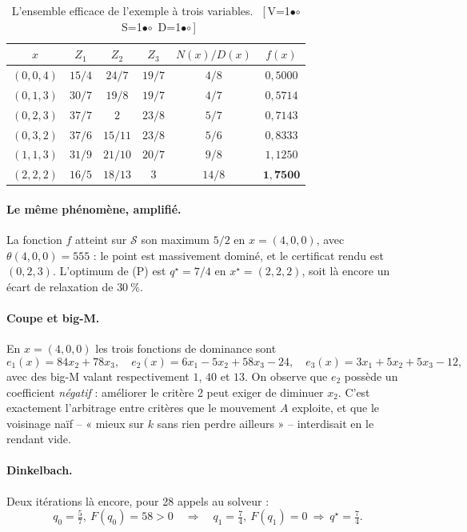 \documentclass[11pt,a4paper]{article}
\theoremstyle{plain}
\theoremstyle{remark}
\newcommand{\Scal}{\mathcal{S}}
\newcommand{\qs}{q^{\star}}
\newcommand{\cfgm}[1]{\ifnum#1=1$\bullet$\else$\circ$\fi}
\newcommand{\conf}[3]{%
  \textsf{\footnotesize[\,V\cfgm{#1}\ S\cfgm{#2}\ D\cfgm{#3}\,]}}
\begin{document}
\begin{table}[H]
\centering
\caption{L'ensemble efficace de l'exemple à trois variables.\ \conf{0}{0}{0}}
\label{tab:ex3E}
\small
\begin{tabular}{cccccc}
\toprule
$x$ & $Z_1$ & $Z_2$ & $Z_3$ & $N(x)/D(x)$ & $f(x)$\\
\midrule
$(0,0,4)$ & $15/4$ & $24/7$ & $19/7$ & $4/8$ & $0{,}5000$\\
$(0,1,3)$ & $30/7$ & $19/8$ & $19/7$ & $4/7$ & $0{,}5714$\\
$(0,2,3)$ & $37/7$ & $2$ & $23/8$ & $5/7$ & $0{,}7143$\\
$(0,3,2)$ & $37/6$ & $15/11$ & $23/8$ & $5/6$ & $0{,}8333$\\
$(1,1,3)$ & $31/9$ & $21/10$ & $20/7$ & $9/8$ & $1{,}1250$\\
$(2,2,2)$ & $16/5$ & $18/13$ & $3$ & $14/8$ & $\mathbf{1{,}7500}$\\
\bottomrule
\end{tabular}
\end{table}

\paragraph{Le même phénomène, amplifié.} La fonction $f$ atteint sur $\Scal$
son maximum $5/2$ en $x=(4,0,0)$, avec $\theta(4,0,0)=555$ : le point est
massivement dominé, et le certificat rendu est $(0,2,3)$. L'optimum de (P)
est $\qs=7/4$ en $x^\star=(2,2,2)$, soit là encore un écart de relaxation de
$30\ \%$.

\paragraph{Coupe et big-M.} En $x=(4,0,0)$ les trois fonctions de dominance
sont
\[
  e_1(x)=84x_2+78x_3,\quad
  e_2(x)=6x_1-5x_2+58x_3-24,\quad
  e_3(x)=3x_1+5x_2+5x_3-12,
\]
avec des big-M valant respectivement $1$, $40$ et $13$. On observe que $e_2$
possède un coefficient \emph{négatif} : améliorer le critère 2 peut exiger de
diminuer $x_2$. C'est exactement l'arbitrage entre critères que le mouvement
$A$ exploite, et que le voisinage naïf -- « mieux sur $k$ sans rien perdre
ailleurs » -- interdisait en le rendant vide.

\paragraph{Dinkelbach.} Deux itérations là encore, pour 28 appels au
solveur :
\[
  q_0=\tfrac{5}{7},\ F(q_0)=58>0
  \quad\Longrightarrow\quad
  q_1=\tfrac{7}{4},\ F(q_1)=0\ \Rightarrow\ \qs=\tfrac{7}{4}.
\]
\end{document}
